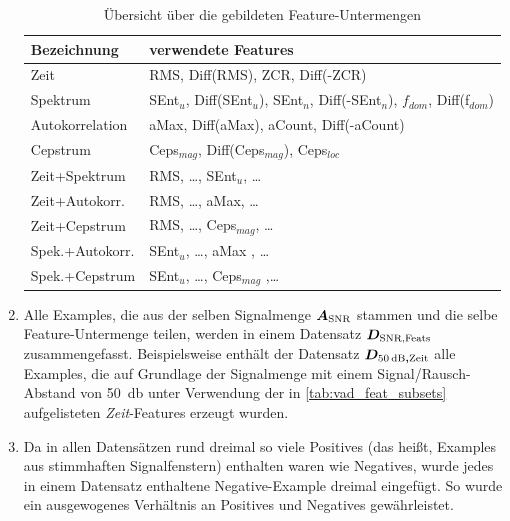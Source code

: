 \begin{enumerate}
\begin{table}[h]
\centering
\caption{Übersicht über die gebildeten Feature-Untermengen}
\label{tab:vad_feat_subsets}
\begin{tabular}{@{}ll@{}}
\toprule
Bezeichnung & verwendete Features                                                              \\ \midrule
Zeit                     & RMS, Diff(RMS), ZCR, Diff(-ZCR)                                                  \\
Spektrum                 & SEnt$_u$, Diff(SEnt$_u$), SEnt$_n$, Diff(-SEnt$_n$), $f_{dom}$, Diff(f$_{dom}$) \\
Autokorrelation          & aMax, Diff(aMax), aCount, Diff(-aCount)                                          \\
Cepstrum                 & Ceps$_{mag}$, Diff(Ceps$_{mag}$), Ceps$_{loc}$                                   \\
Zeit+Spektrum            & RMS, \ldots , SEnt$_u$, \ldots                                                   \\
Zeit+Autokorr.           & RMS, \ldots , aMax, \ldots                                                       \\
Zeit+Cepstrum            & RMS, \ldots , Ceps$_{mag}$, \ldots                                               \\
Spek.+Autokorr.          & SEnt$_u$, \ldots , aMax , \ldots                                                 \\
Spek.+Cepstrum           & SEnt$_u$, \ldots, Ceps$_{mag}$ ,\ldots                                           \\ \bottomrule
\end{tabular}
\end{table}

\item Alle Examples, die aus der selben Signalmenge $\boldmath{A_{\text{SNR}}}$ stammen und die selbe Feature-Untermenge teilen, werden in einem Datensatz $\boldmath{D_{\text{SNR,Feats}}}$ zusammengefasst. Beispielsweise enthält der Datensatz $\boldmath{D_{\SI{50}{\decibel},\text{Zeit}}}$ alle Examples, die auf Grundlage der Signalmenge mit einem Signal/Rausch-Abstand von \SI{50}{\decibel} unter Verwendung der in \autoref{tab:vad_feat_subsets} aufgelisteten \emph{Zeit}-Features erzeugt wurden.
\item Da in allen Datensätzen rund dreimal so viele Positives (das heißt, Examples aus stimmhaften Signalfenstern) enthalten waren wie Negatives, wurde jedes in einem Datensatz enthaltene Negative-Example dreimal eingefügt. So wurde ein ausgewogenes Verhältnis an Positives und Negatives gewährleistet.
\end{enumerate}

